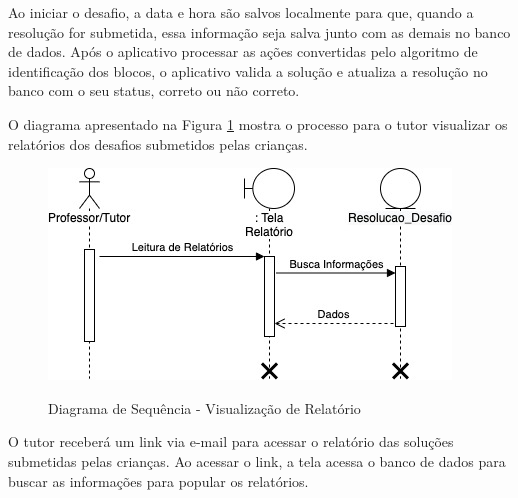         Ao iniciar o desafio, a data e hora são salvos localmente para que, quando a resolução for submetida, essa informação seja salva junto com as demais no banco de dados. Após o aplicativo processar as ações convertidas pelo algoritmo de identificação dos blocos, o aplicativo valida a solução e atualiza a resolução no banco com o seu status, correto ou não correto.
        
        
        O diagrama apresentado na Figura \ref{figura:sequencia_tutor} mostra o processo para o tutor visualizar os relatórios dos desafios submetidos pelas crianças.
        
        \begin{figure}[H]
            \caption{Diagrama de Sequência - Visualização de Relatório}
            \centering
                \includegraphics[width=\linewidth]{Imagens/Cap3/sequencia_tutor.jpg}
            \label{figura:sequencia_tutor}
        \end{figure}
        
        O tutor receberá um link via e-mail para acessar o relatório das soluções submetidas pelas crianças. Ao acessar o link, a tela acessa o banco de dados para buscar as informações para popular os relatórios.